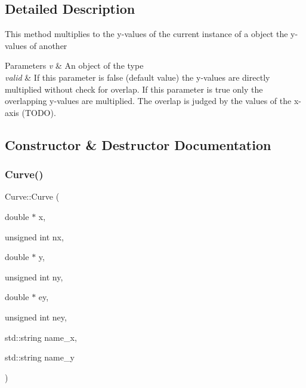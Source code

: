 \subsection{Detailed Description}
This method multiplies to the y-\/values of the current instance of a object the y-\/values of another


\begin{DoxyParams}{Parameters}
{\em v} & An object of the type\\
\hline
{\em valid} & If this parameter is false (default value) the y-\/values are directly multiplied without check for overlap. If this parameter is true only the overlapping y-\/values are multiplied. The overlap is judged by the values of the x-\/axis (T\+O\+DO). \\
\hline
\end{DoxyParams}


\subsection{Constructor \& Destructor Documentation}
\mbox{\label{class_curve_a627534496c4472dedcb5c8bd67f579d0}} 
\subsubsection{\texorpdfstring{Curve()}{Curve()}\hspace{0.1cm}{\footnotesize\ttfamily [1/6]}}
{\footnotesize\ttfamily Curve\+::\+Curve (\begin{DoxyParamCaption}\item[{double $\ast$}]{x,  }\item[{unsigned int}]{nx,  }\item[{double $\ast$}]{y,  }\item[{unsigned int}]{ny,  }\item[{double $\ast$}]{ey,  }\item[{unsigned int}]{ney,  }\item[{std\+::string}]{name\+\_\+x,  }\item[{std\+::string}]{name\+\_\+y }\end{DoxyParamCaption})}

\mbox{\label{class_curve_a25dc8db43ed446103e71652dd37f4822}} 
